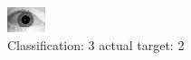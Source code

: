 \begin{figure}[h!]
\begin{center}
\includegraphics[width=0.60\columnwidth]{figures/ID1654_class_3_target_2.png}
\end{center}
\caption{ Classification: 3 actual target: 2}
\label{fig:ID1654_class_3_target_2}
\end{figure}
